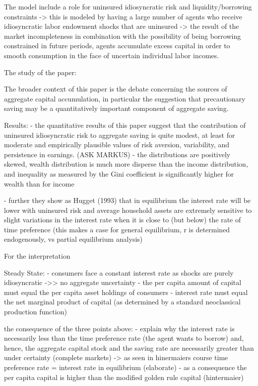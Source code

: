 The model include a role for uninsured idiosyncratic risk and liquidity/borrowing constraints
	-> this is modeled by having a large number of agents who receive idiosyncratic labor endowment shocks that are uninsured
		-> the result of the market incompleteness in combination with the possibility of being borrowing constrained in future periods, agents accumulate excess capital in order to smooth consumption in the face of uncertain individual labor incomes. 

The study of the paper:

The broader context of this paper is the debate concerning the sources of aggregate capital accumulation, in particular the suggestion that precautionary saving may be a quantitatively important component of aggregate saving. 

Results: 
- the quantitative results of this paper suggest that the contribution of uninsured idiosyncratic risk to aggregate saving is quite modest, at least for moderate and empirically plausible values of risk aversion, variability, and persistence in earnings. (ASK MARKUS)
- the distributions are positively skewed, wealth distribution is much more disperse than the income distribution, and inequality as measured by the Gini coefficient is significantly higher for wealth than for income 

- further they show as Hugget (1993) that in equilibrium the interest rate will be lower with uninsured risk and average household assets are extremely sensitive to slight variations in the interest rate when it is close to (but below) the rate of time preference (this makes a case for general equilibrium, r is determined endogenously, vs partial equilibrium analysis)

For the interpretation 

Steady State: 
- consumers face a constant interest rate as shocks are purely idiosyncratic ->> no aggregate uncertainty 
- the per capita amount of capital must equal the per capita asset holdings of consumers
- interest rate must equal the net marginal product of capital (as determined by a standard neoclassical production function)

the consequence of the three points above:
	- explain why the interest rate is necessarily less than the time preference rate (the agent wants to borrow) and, hence, the aggregate capital stock and the saving rate are necessarily greater than under certainty (complete markets) 
	-> as seen in hinermaiers course time preference rate = interest rate in equilibrium (elaborate)
	- as a consequence the per capita capital is higher than the modified golden rule capital (hintermaier)


